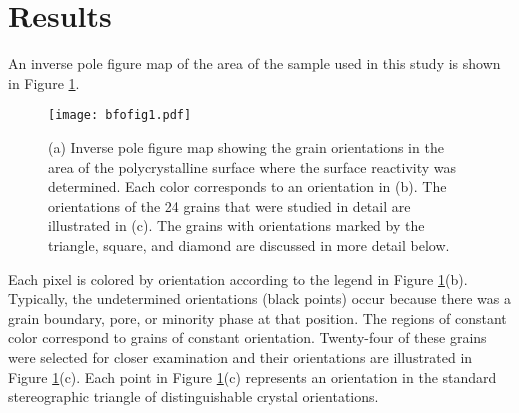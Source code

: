 \section{Results}
\label{sec:ch7results}


An inverse pole figure map of the area of the sample used in this study is shown in Figure \ref{fig:bfofig1}.
	\begin{figure}
		\texttt{[image: bfofig1.pdf]}
		\caption[Orientation data for examined  grains]{%
			(a) Inverse pole figure map showing the grain orientations 
			in the area of the polycrystalline  surface where 
			the surface reactivity was determined. Each color corresponds 
			to an orientation in (b). The orientations of the 24 grains 
			that were studied in detail are illustrated in (c). The grains 
			with orientations marked by the triangle, square, and diamond 
			are discussed in more detail below.}
		\label{fig:bfofig1}
\end{figure}
Each pixel is colored by orientation according to the legend in Figure \ref{fig:bfofig1}(b). Typically, the undetermined orientations (black points) occur because there was a grain boundary, pore, or minority phase at that position. The regions of constant color correspond to grains of constant orientation. Twenty-four of these grains were selected for closer examination and their orientations are illustrated in Figure \ref{fig:bfofig1}(c). Each point in Figure \ref{fig:bfofig1}(c) represents an orientation in the standard stereographic triangle of distinguishable crystal orientations.


